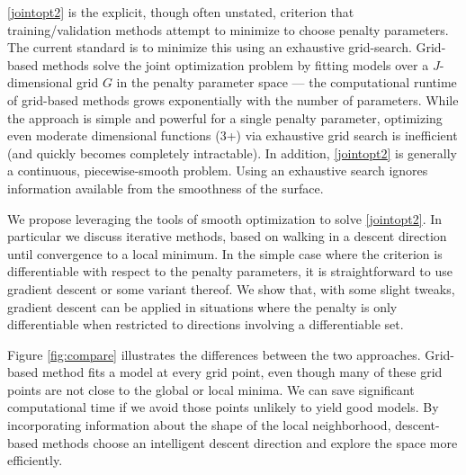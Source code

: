 \documentclass[10pt,letterpaper]{article}
\begin{document}
\eqref{jointopt2} is the explicit, though often unstated, criterion that training/validation methods attempt to minimize to choose penalty parameters. The current standard is to minimize this using an exhaustive grid-search. Grid-based methods solve the joint optimization problem by fitting models over a $J$-dimensional grid $G$ in the penalty parameter space --- the computational runtime of grid-based methods grows exponentially with the number of parameters. While the approach is simple and powerful for a single penalty parameter, optimizing even moderate dimensional functions (3+) via exhaustive grid search is inefficient (and quickly becomes completely intractable).  In addition, \eqref{jointopt2} is generally a continuous, piecewise-smooth problem. Using an exhaustive search ignores information available from the smoothness of the surface. 

We propose leveraging the tools of smooth optimization to solve \eqref{jointopt2}. In particular we discuss iterative methods, based on walking in a descent direction until convergence to a local minimum. In the simple case where the criterion is differentiable with respect to the penalty parameters, it is straightforward to use gradient descent or some variant thereof. We show that, with some slight tweaks, gradient descent can be applied in situations where the penalty is only differentiable when restricted to directions involving a differentiable set.

Figure \ref{fig:compare} illustrates the differences between the two approaches. Grid-based method fits a model at every grid point, even though many of these grid points are not close to the global or local minima. We can save significant computational time if we avoid those points unlikely to yield good models. By incorporating information about the shape of the local neighborhood, descent-based methods choose an intelligent descent direction and explore the space more efficiently. 
\end{document}
